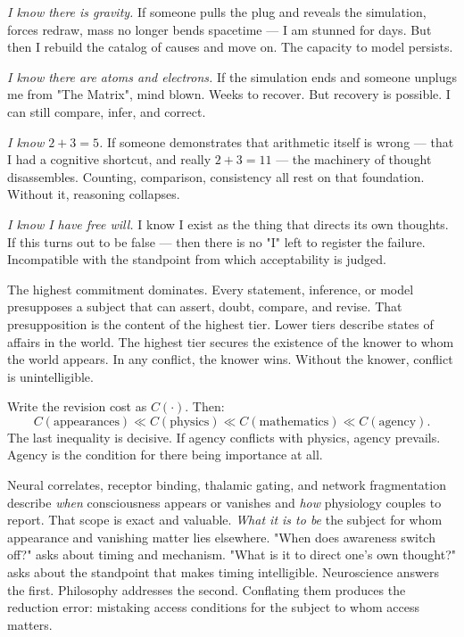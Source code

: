 \textit{I know there is gravity.} If someone pulls the plug and reveals the simulation, forces redraw, mass no longer bends spacetime — I am stunned for days. But then I rebuild the catalog of causes and move on. The capacity to model persists.

\textit{I know there are atoms and electrons.} If the simulation ends and someone unplugs me from "The Matrix", mind blown. Weeks to recover. But recovery is possible. I can still compare, infer, and correct.

\textit{I know $2+3=5$.} If someone demonstrates that arithmetic itself is wrong — that I had a cognitive shortcut, and really $2+3=11$ — the machinery of thought disassembles. Counting, comparison, consistency all rest on that foundation. Without it, reasoning collapses.

\textit{I know I have free will.} I know I exist as the thing that directs its own thoughts. If this turns out to be false — then there is no "I" left to register the failure. Incompatible with the standpoint from which acceptability is judged.

\medskip

The highest commitment dominates. Every statement, inference, or model presupposes a subject that can assert, doubt, compare, and revise. That presupposition is the content of the highest tier. Lower tiers describe states of affairs in the world. The highest tier secures the existence of the knower to whom the world appears. In any conflict, the knower wins. Without the knower, conflict is unintelligible.

Write the revision cost as $C(\cdot)$. Then:
\[
C(\text{appearances}) \ll C(\text{physics}) \ll C(\text{mathematics}) \ll C(\text{agency}).
\]
The last inequality is decisive. If agency conflicts with physics, agency prevails. Agency is the condition for there being importance at all.

Neural correlates, receptor binding, thalamic gating, and network fragmentation describe \textit{when} consciousness appears or vanishes and \textit{how} physiology couples to report. That scope is exact and valuable. \textit{What it is to be} the subject for whom appearance and vanishing matter lies elsewhere. "When does awareness switch off?" asks about timing and mechanism. "What is it to direct one's own thought?" asks about the standpoint that makes timing intelligible. Neuroscience answers the first. Philosophy addresses the second. Conflating them produces the reduction error: mistaking access conditions for the subject to whom access matters.

